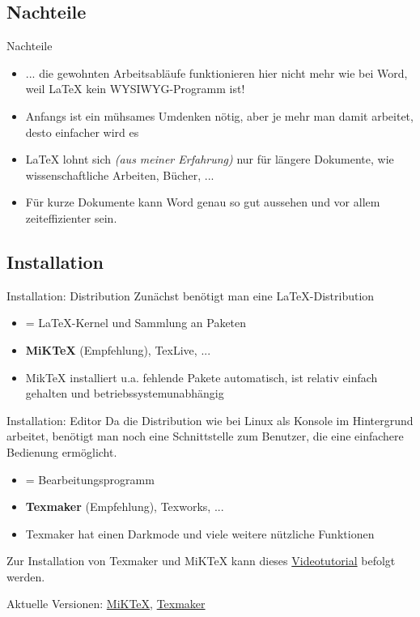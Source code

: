 \documentclass[xcolor=dvipsnames]{beamer}
\begin{document}
\subsection{Nachteile}
\begin{frame}{Nachteile}
\begin{itemize}
	\item ... die gewohnten Arbeitsabläufe funktionieren hier nicht mehr wie bei Word, weil \LaTeX{} kein WYSIWYG-Programm ist!
	\item Anfangs ist ein mühsames Umdenken nötig, aber je mehr man damit arbeitet, desto einfacher wird es
	\item \LaTeX{} lohnt sich \textit{(aus meiner Erfahrung)} nur für längere Dokumente, wie wissenschaftliche Arbeiten, Bücher, ...
	\item Für kurze Dokumente kann Word genau so gut aussehen und vor allem zeiteffizienter sein.
\end{itemize}
\end{frame}


\subsection{Installation}
\begin{frame}{Installation: Distribution}
Zunächst benötigt man eine \LaTeX{}-Distribution
\begin{itemize}
	\item = \LaTeX{}-Kernel und Sammlung an Paketen
	\item \textbf{MiKTeX} (Empfehlung), TexLive, ...
	\item MikTeX installiert u.a. fehlende Pakete automatisch, ist relativ einfach gehalten und betriebssystemunabhängig
\end{itemize}
\end{frame}


\begin{frame}{Installation: Editor}
Da die Distribution wie bei Linux als Konsole im Hintergrund arbeitet, benötigt man noch eine Schnittstelle zum Benutzer, die eine einfachere Bedienung ermöglicht.
\begin{itemize}
	\item = Bearbeitungsprogramm
	\item \textbf{Texmaker} (Empfehlung), Texworks, ...
	\item Texmaker hat einen Darkmode und viele weitere nützliche Funktionen
\end{itemize}
Zur Installation von Texmaker und MiKTeX kann dieses \href{https://www.youtube.com/watch?v=aTOfbfJvUig}{Videotutorial} befolgt werden. \par\medskip
Aktuelle Versionen: \href{https://miktex.org/download}{MiKTeX}, \href{https://www.xm1math.net/texmaker/download.html}{Texmaker}
\end{frame}
\end{document}
